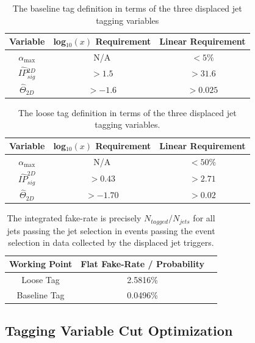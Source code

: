 \begin{table}
\begin{center}
\caption{The baseline tag definition in terms of the three displaced jet tagging variables \label{tab:tag_def}}
\begin{tabular}{ccc}
\textbf{Variable} & \textbf{log$_{10}(x)$ Requirement} & \textbf{Linear Requirement}\\
\hline 
$\alpha_{\textrm{max}}$  & N/A &  $<5\%$ \\
$\widehat{IP}{}^{2D}_{sig}$  &  $>1.5$ & $>31.6$ \\
$\widehat{\Theta}_{2D}$  &  $>-1.6$ & $>0.025$
\end{tabular}
\end{center}
\end{table}

\begin{table}
\caption{The loose tag definition in terms of the three displaced jet tagging variables. \label{tab:loose_tag_def}}
\begin{center}
\begin{tabular}{ccc}
\textbf{Variable} & \textbf{log$_{10}(x)$ Requirement} & \textbf{Linear Requirement}\\
\hline 
$\alpha_{\textrm{max}}$  &  N/A & $<50\%$\\
$\widehat{IP}^{2D}_{sig}$  &  $>0.43$ &  $>2.71$\\
$\widehat{\Theta}_{2D}$  &  $>-1.70$ & $>0.02$ 
\end{tabular}
\end{center}
\end{table}

\begin{table}
\caption{The integrated fake-rate is precisely $N_{tagged}/N_{jets}$ for all jets passing the jet selection in events
passing the event selection in data collected by the displaced jet triggers. \label{tab:fake_rate_wp}}
\begin{center}
\begin{tabular}{ccc}
\textbf{Working Point} & Flat Fake-Rate / Probability \\
\hline 
Loose Tag & 2.5816\%\\
Baseline Tag & 0.0496\%\\
\end{tabular}

\end{center}
\end{table}


\subsection{Tagging Variable Cut Optimization}

